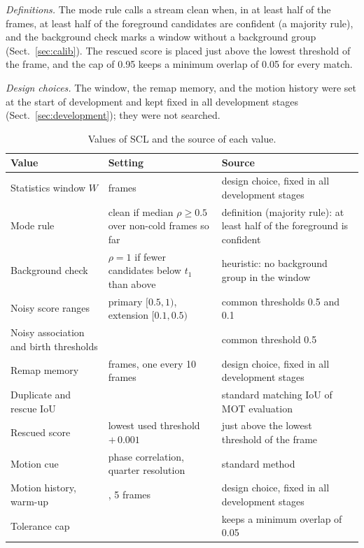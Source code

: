 \documentclass[pdflatex,sn-mathphys-num,iicol]{sn-jnl}
\newcommand{\scl}{SCL}
\begin{document}
\emph{Definitions.} The mode rule calls a stream clean when, in at least half of the frames, at
least half of the foreground candidates are confident (a majority rule), and the background check
marks a window without a background group (Sect.~\ref{sec:calib}). The
rescued score is placed just above the lowest threshold of the frame, and the cap of 0.95 keeps a
minimum overlap of 0.05 for every match.

\emph{Design choices.} The window, the remap memory, and the motion history were set at the start
of development and kept fixed in all development stages (Sect.~\ref{sec:development}); they were
not searched.

\begin{table}[t]
\caption{Values of \scl{} and the source of each value.}
\label{tab:constants}
\centering\footnotesize
\setlength{\tabcolsep}{4pt}
\begin{tabular}{@{}>{\raggedright\arraybackslash}p{40mm}>{\raggedright\arraybackslash}p{52mm}>{\raggedright\arraybackslash}p{58mm}@{}}
\toprule
Value & Setting & Source\\
\midrule
Statistics window $W$ & 10 frames & design choice, fixed in all development stages\\
Mode rule & clean if median $\rho\ge0.5$ over non-cold frames so far & definition (majority rule): at least half of the foreground is confident\\
Background check & $\rho=1$ if fewer candidates below $t_1$ than above & heuristic: no background group in the window\\
Noisy score ranges & primary $[0.5,1)$, extension $[0.1,0.5)$ & common thresholds 0.5 and 0.1\\
Noisy association and birth thresholds & 0.5 & common threshold 0.5\\
Remap memory & 20 frames, one every 10 frames & design choice, fixed in all development stages\\
Duplicate and rescue IoU & 0.5 & standard matching IoU of MOT evaluation\\
Rescued score & lowest used threshold $+\,0.001$ & just above the lowest threshold of the frame\\
Motion cue & phase correlation, quarter resolution & standard method \cite{reddy1996phasecorr}\\
Motion history, warm-up & 100, 5 frames & design choice, fixed in all development stages\\
Tolerance cap & 0.95 & keeps a minimum overlap of 0.05\\
\bottomrule
\end{tabular}
\end{table}
\end{document}
